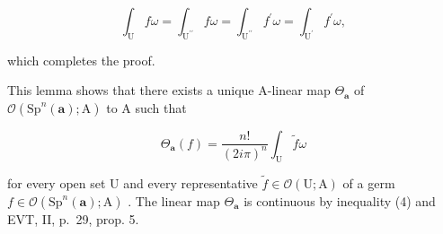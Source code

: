 \[
\int_ {\mathrm{U}} f \omega = \int_ {\mathrm {U^ {\prime\prime}}} f \omega = \int_ {\mathrm {U^ {\prime\prime}}} f ^ {\prime} \omega = \int_ {\mathrm {U^ {\prime}}} f ^ {\prime} \omega ,
\]

which completes the proof.

This lemma shows that there exists a unique A-linear map \(\Theta_{\boldsymbol{a}}\) of \(\mathcal{O}(\mathrm{Sp}^{n}(\boldsymbol{a});\mathrm{A})\) to A such that

\[
\Theta_ {\boldsymbol {a}} (f) = \frac {n !}{(2 i \pi) ^ {n}} \int_ {\mathrm{U}} \widetilde {f} \omega\tag{5}
\]

for every open set U and every representative \(\tilde{f} \in \mathcal{O}(\mathrm{U};\mathrm{A})\) of a germ \(f \in \mathcal{O}(\mathrm{Sp}^n (\boldsymbol {a});\mathrm{A})\) . The linear map \(\Theta_{\boldsymbol{a}}\) is continuous by inequality (4) and EVT, II, p.~29, prop. 5.
